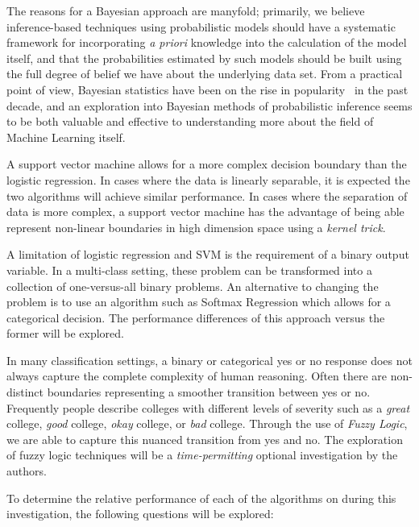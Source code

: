 \documentclass[10pt]{article}
\begin{document}
The reasons for a Bayesian approach are manyfold; primarily, we believe inference-based techniques using probabilistic models should have a systematic framework for incorporating {\it a priori} knowledge into the calculation of the model itself, and that the probabilities estimated by such models should be built using the full degree of belief we have about the underlying data set. From a practical point of view, Bayesian statistics have been on the rise in popularity~\cite{ashby2006bayesian} in the past decade, and an exploration into Bayesian methods of probabilistic inference seems to be both valuable and effective to understanding more about the field of Machine Learning itself. 

A support vector machine allows for a more complex decision boundary than the logistic regression. In cases where the data is linearly separable, it is expected the two algorithms will achieve similar performance. In cases where the separation of data is more complex, a support vector machine has the advantage of being able represent non-linear boundaries in high dimension space using a \textit{kernel trick}.

A limitation of logistic regression and SVM is the requirement of a binary output variable. In a multi-class setting, these problem can be transformed into a collection of one-versus-all binary problems. An alternative to changing the problem is to use an algorithm such as Softmax Regression which allows for a categorical decision. The performance differences of this approach versus the former will be explored. 

In many classification settings, a binary or categorical yes or no response does not always capture the complete complexity of human reasoning. Often there are non-distinct boundaries representing a smoother transition between yes or no. Frequently people describe colleges with different levels of severity such as a \textit{great} college, \textit{good} college, \textit{okay} college, or \textit{bad} college. Through the use of \textit{Fuzzy Logic}, we are able to capture this nuanced transition from yes and no. The exploration of fuzzy logic techniques will be a \textit{time-permitting} optional investigation by the authors.

To determine the relative performance of each of the algorithms on during this investigation, the following questions will be explored:
\end{document}
